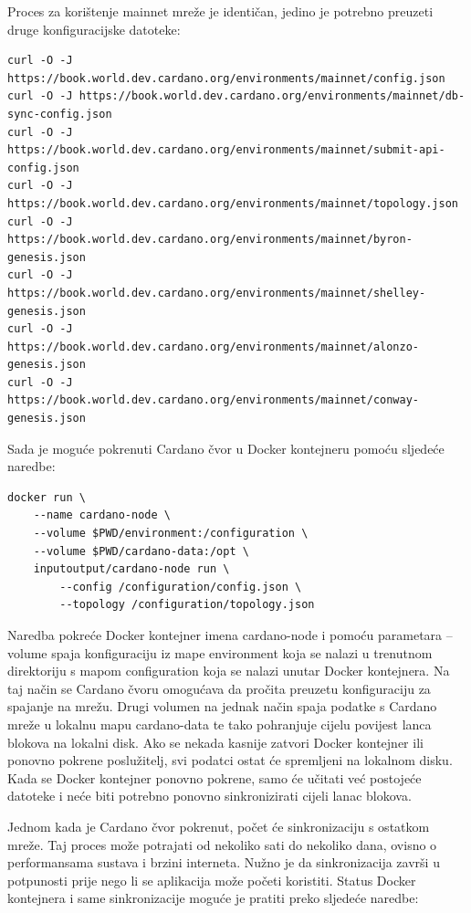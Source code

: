 \documentclass[times, utf8, diplomski]{fer}
\begin{document}
Proces za korištenje mainnet mreže je identičan, jedino je potrebno preuzeti druge konfiguracijske datoteke:

\begin{lstlisting}
curl -O -J https://book.world.dev.cardano.org/environments/mainnet/config.json
curl -O -J https://book.world.dev.cardano.org/environments/mainnet/db-sync-config.json
curl -O -J https://book.world.dev.cardano.org/environments/mainnet/submit-api-config.json
curl -O -J https://book.world.dev.cardano.org/environments/mainnet/topology.json
curl -O -J https://book.world.dev.cardano.org/environments/mainnet/byron-genesis.json
curl -O -J https://book.world.dev.cardano.org/environments/mainnet/shelley-genesis.json
curl -O -J https://book.world.dev.cardano.org/environments/mainnet/alonzo-genesis.json
curl -O -J https://book.world.dev.cardano.org/environments/mainnet/conway-genesis.json
\end{lstlisting}

Sada je moguće pokrenuti Cardano čvor u Docker kontejneru pomoću sljedeće naredbe:

\begin{lstlisting}
docker run \
    --name cardano-node \
    --volume $PWD/environment:/configuration \
    --volume $PWD/cardano-data:/opt \
    inputoutput/cardano-node run \
        --config /configuration/config.json \
        --topology /configuration/topology.json
\end{lstlisting}

Naredba pokreće Docker kontejner imena cardano-node i pomoću parametara --volume spaja konfiguraciju iz mape environment koja se nalazi u trenutnom direktoriju s mapom configuration koja se nalazi unutar Docker kontejnera. Na taj način se Cardano čvoru omogućava da pročita preuzetu konfiguraciju za spajanje na mrežu. Drugi volumen na jednak način spaja podatke s Cardano mreže u lokalnu mapu cardano-data te tako pohranjuje cijelu povijest lanca blokova na lokalni disk. Ako se nekada kasnije zatvori Docker kontejner ili ponovno pokrene poslužitelj, svi podatci ostat će spremljeni na lokalnom disku. Kada se Docker kontejner ponovno pokrene, samo će učitati već postojeće datoteke i neće biti potrebno ponovno sinkronizirati cijeli lanac blokova.

Jednom kada je Cardano čvor pokrenut, počet će sinkronizaciju s ostatkom mreže. Taj proces može potrajati od nekoliko sati do nekoliko dana, ovisno o performansama sustava i brzini interneta. Nužno je da sinkronizacija završi u potpunosti prije nego li se aplikacija može početi koristiti. Status Docker kontejnera i same sinkronizacije moguće je pratiti preko sljedeće naredbe:
\end{document}
